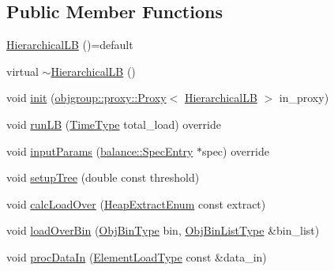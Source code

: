 \subsection*{Public Member Functions}
\begin{DoxyCompactItemize}
\item 
\hyperlink{structvt_1_1vrt_1_1collection_1_1lb_1_1_hierarchical_l_b_ac654b0d8eca15063f5138ec56ebb2bbb}{Hierarchical\+LB} ()=default
\item 
virtual \hyperlink{structvt_1_1vrt_1_1collection_1_1lb_1_1_hierarchical_l_b_aa2b6be5befe22ad9edcf796e9ac91568}{$\sim$\+Hierarchical\+LB} ()
\item 
void \hyperlink{structvt_1_1vrt_1_1collection_1_1lb_1_1_hierarchical_l_b_a3200eb80dca7ad15c7f881dc418f22f7}{init} (\hyperlink{structvt_1_1objgroup_1_1proxy_1_1_proxy}{objgroup\+::proxy\+::\+Proxy}$<$ \hyperlink{structvt_1_1vrt_1_1collection_1_1lb_1_1_hierarchical_l_b}{Hierarchical\+LB} $>$ in\+\_\+proxy)
\item 
void \hyperlink{structvt_1_1vrt_1_1collection_1_1lb_1_1_hierarchical_l_b_a8678acfa7b587e6003a4701def240595}{run\+LB} (\hyperlink{namespacevt_a876a9d0cd5a952859c72de8a46881442}{Time\+Type} total\+\_\+load) override
\item 
void \hyperlink{structvt_1_1vrt_1_1collection_1_1lb_1_1_hierarchical_l_b_a5648ef8b00795a3ecfb2e07a4ee44345}{input\+Params} (\hyperlink{structvt_1_1vrt_1_1collection_1_1balance_1_1_spec_entry}{balance\+::\+Spec\+Entry} $\ast$spec) override
\item 
void \hyperlink{structvt_1_1vrt_1_1collection_1_1lb_1_1_hierarchical_l_b_ad357ef0c0f5565f7119d4cfd23d119fd}{setup\+Tree} (double const threshold)
\item 
void \hyperlink{structvt_1_1vrt_1_1collection_1_1lb_1_1_hierarchical_l_b_a6fb4de858caf08759fe503b04f4cdded}{calc\+Load\+Over} (\hyperlink{namespacevt_1_1vrt_1_1collection_1_1lb_aeb0f47cf4b89bed7ea05462d0c2e5b5e}{Heap\+Extract\+Enum} const extract)
\item 
void \hyperlink{structvt_1_1vrt_1_1collection_1_1lb_1_1_hierarchical_l_b_a81e03ca1264d0b2cf9b0ee3eef7f792a}{load\+Over\+Bin} (\hyperlink{structvt_1_1vrt_1_1collection_1_1lb_1_1_load_sampler_base_l_b_acb55af31b27a3c248d351189abd78487}{Obj\+Bin\+Type} bin, \hyperlink{structvt_1_1vrt_1_1collection_1_1lb_1_1_load_sampler_base_l_b_a58de8f1e1204cf52b661b3906e2d9eeb}{Obj\+Bin\+List\+Type} \&bin\+\_\+list)
\item 
void \hyperlink{structvt_1_1vrt_1_1collection_1_1lb_1_1_hierarchical_l_b_afcd789adcc57348b7da92801119bd8f1}{proc\+Data\+In} (\hyperlink{structvt_1_1vrt_1_1collection_1_1lb_1_1_base_l_b_aa286d31a0820a8fc9218ccb858368fca}{Element\+Load\+Type} const \&data\+\_\+in)
\end{DoxyCompactItemize}
